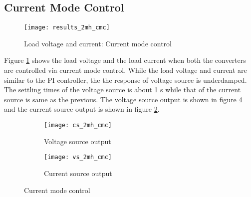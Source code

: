 \subsection{Current Mode Control}
	\begin{figure}[H]
		\centering
		\texttt{[image: results\_2mh\_cmc]}
		\caption{Load voltage and current: Current mode control}
		\label{fig:results_2mh_cmc}
	\end{figure}
	Figure \ref{fig:results_2mh_cmc} shows the load voltage and the load current when both the converters are controlled via current mode control. While the load voltage and current are similar to the PI controller, the the response of voltage source is underdamped. The settling times of the voltage source is about 1 s while that of the current source is same as the previous. The voltage source output is shown in figure \ref{fig:vs_2mh_cmc} and the current source output is shown in figure \ref{fig:cs_2mh_cmc}.
	\begin{figure}[H]
		\centering
		\begin{subfigure}{0.49\linewidth}
			\texttt{[image: cs\_2mh\_cmc]}
			\caption{Voltage source output}
			\label{fig:cs_2mh_cmc}
		\end{subfigure}
		\begin{subfigure}{0.49\linewidth}
			\texttt{[image: vs\_2mh\_cmc]}
			\caption{Current source output}
			\label{fig:vs_2mh_cmc}
		\end{subfigure}
		\caption{Current mode control}
	\end{figure}
